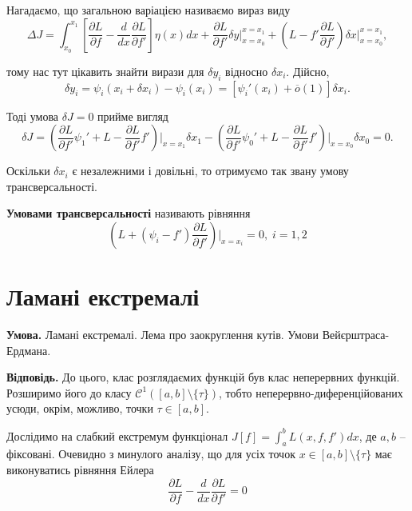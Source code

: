 \documentclass[14pt]{extarticle}
\newcommand{\<}{\langle}
\renewcommand{\>}{\rangle}
\theoremstyle{mystyle}{\newtheorem{definition}{Definition}[section]}
\theoremstyle{mystyle}{\newtheorem{proposition}[definition]{Proposition}}
\theoremstyle{mystyle}{\newtheorem{theorem}[definition]{Theorem}}
\theoremstyle{mystyle}{\newtheorem{lemma}[definition]{Lemma}}
\theoremstyle{mystyle}{\newtheorem{corollary}[definition]{Corollary}}
\theoremstyle{mystyle}{\newtheorem*{remark}{Remark}}
\theoremstyle{mystyle}{\newtheorem*{remarks}{Remarks}}
\theoremstyle{mystyle}{\newtheorem*{example}{Example}}
\theoremstyle{mystyle}{\newtheorem*{examples}{Examples}}
\theoremstyle{definition}{\newtheorem*{exercise}{Exercise}}
\theoremstyle{cstyle}{\newtheorem*{cthm}{}}
\theoremstyle{warn}
\begin{document}
Нагадаємо, що загальною варіацією називаємо вираз виду
\begin{equation}
    \Delta J = \int_{x_0}^{x_1}\left[\frac{\partial L}{\partial f}-\frac{d}{dx}\frac{\partial L}{\partial f'}\right]\eta(x)dx + \frac{\partial L}{\partial f'}\delta y\Big|_{x=x_0}^{x=x_1} +
    \left(L-f'\frac{\partial L}{\partial f'}\right)\delta x \Big|_{x=x_0}^{x=x_1},
\end{equation}

тому нас тут цікавить знайти вирази для $\delta y_i$ відносно $\delta x_i$. Дійсно,
\begin{equation}
    \delta y_i = \psi_i(x_i+\delta x_i) - \psi_i(x_i) = [\psi_i'(x_i)+\overline{o}(1)]\delta x_i.
\end{equation}

Тоді умова $\delta J=0$ прийме вигляд
\begin{equation}
    \delta J = \left(\frac{\partial L}{\partial f'}\psi_1' + L - \frac{\partial L}{\partial f'}f'\right)\Big|_{x=x_1}\delta x_1 - \left(\frac{\partial L}{\partial f'}\psi_0' + L - \frac{\partial L}{\partial f'}f'\right)\Big|_{x=x_0}\delta x_0 = 0.
\end{equation}

Оскільки $\delta x_i$ є незалежними і довільні, то отримуємо так звану умову трансверсальності.
\begin{definition}
\textbf{Умовами трансверсальності} називають рівняння
\begin{equation}
    \left(L+(\psi_i-f')\frac{\partial L}{\partial f'}\right)\Big|_{x=x_i} = 0, \; i=1,2  
\end{equation}
\end{definition}

\pagebreak

\section{Ламані екстремалі}

\textbf{Умова.} Ламані екстремалі. Лема про заокруглення кутів. Умови Вейєрштраса-Ердмана.

\textbf{Відповідь.} До цього, клас розглядаємих функцій був клас неперервних функцій. Розширимо його до класу $\mathcal{C}^1([a,b] \setminus \{\tau\})$, тобто неперервно-диференційованих усюди, окрім, можливо, точки $\tau \in [a,b]$.

Дослідимо на слабкий екстремум функціонал $J[f]=\int_a^b L(x,f,f')dx$, де $a,b$ -- фіксовані. Очевидно з минулого аналізу, що для усіх точок $x \in [a,b] \setminus \{\tau\}$ має виконуватись рівняння Ейлера
\begin{equation}
    \frac{\partial L}{\partial f} - \frac{d}{dx}\frac{\partial L}{\partial f'} = 0
\end{equation}
\end{document}
